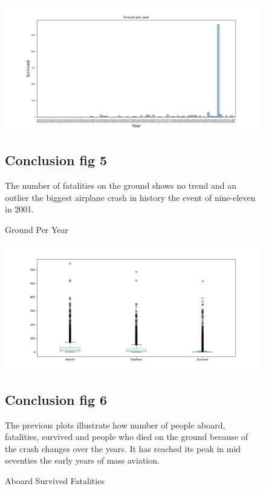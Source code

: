 \documentclass{article}
\begin{document}
\begin{figure}[!hbt]
\includegraphics[width=1.3\linewidth,height=0.500\textheight]{Ground_per_year.png}
\caption{Ground Per Year}
\label{fig5:}
\subsection{Conclusion fig 5}
The number of fatalities  on the ground shows no trend and an outlier the biggest airplane crash in history the event of nine-eleven in 2001.
\end{figure}

\begin{figure}[!hbt]
\includegraphics[width=1.3\linewidth,height=0.500\textheight]{boxplot.png}
\caption{Aboard Survived Fatalities }
\label{fig6:}
\subsection{Conclusion fig 6}
The previous plots illustrate how number of people aboard, fatalities, survived and people who died on the ground because of the crash changes over the years. It has reached its peak in mid seventies the early years of mass aviation.
\end{figure}
\end{document}
